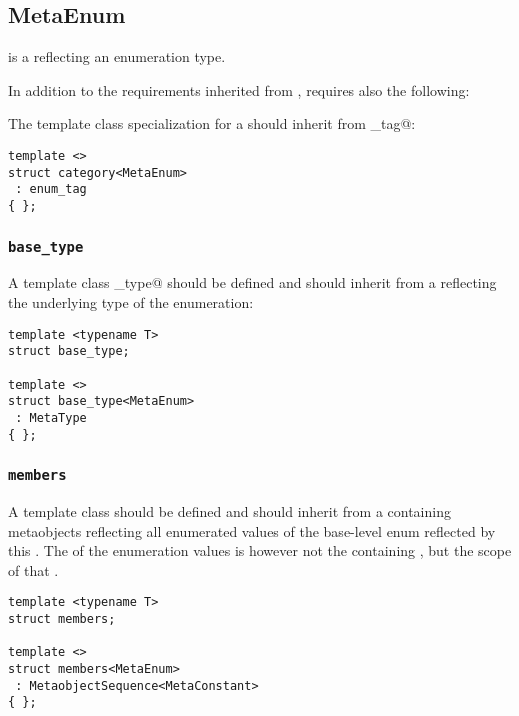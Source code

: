 \subsection{MetaEnum}
\label{concept-MetaEnum}

 is a  reflecting an enumeration type.

In addition to the requirements inherited from ,  requires
also the following:

The \verb@category@ template class specialization for a  should
inherit from \verb@enum_tag@:

\begin{verbatim}
template <>
struct category<MetaEnum>
 : enum_tag
{ };
\end{verbatim}

\subsubsection{\texttt{base\_type}}

A template class \verb@base_type@ should be defined and should inherit from
a  reflecting the underlying type of the enumeration:

\begin{verbatim}
template <typename T>
struct base_type;

template <>
struct base_type<MetaEnum>
 : MetaType
{ };
\end{verbatim}

\subsubsection{\texttt{members}}

A template class \verb@members@ should be defined and should inherit from a
 containing   metaobjects
reflecting all enumerated values of the base-level enum reflected by
this . The \verb@scope@ of the enumeration values is however not the
containing \verb@enum@, but the scope of that \verb@enum@.

\begin{verbatim}
template <typename T>
struct members;

template <>
struct members<MetaEnum>
 : MetaobjectSequence<MetaConstant>
{ };
\end{verbatim}

